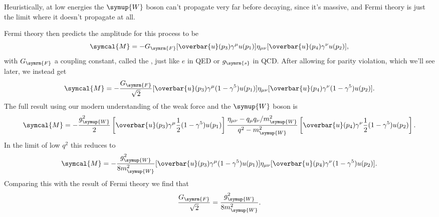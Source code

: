 \documentclass[fleqn]{NotesClass}
\newcommand{\Pparticle}[1]{\symup{#1}}
\newcommand{\PW}{\ensuremath{\Pparticle{W}}}
\newcommand{\strongCoupling}{g_{\symrm{s}}}
\newcommand{\amplitude}{\symcal{M}}
\newcommand{\diracadjoint}[1]{\overbar{#1}}
\newcommand{\minkowskiMetric}{\eta}
\newcommand{\fermiConstant}{G_{\symrm{F}}}
\begin{document}
    Heuristically, at low energies the \PW{} boson can't propagate very far before decaying, since it's massive, and Fermi theory is just the limit where it doesn't propagate at all.
    
    Fermi theory then predicts the amplitude for this process to be
    \begin{equation}
        \amplitude = -\fermiConstant[\overbar{u}(p_3) \gamma^\mu u(p_1)] \minkowskiMetric_{\mu\nu} [\overbar{u}(p_4) \gamma^\nu u(p_2)],
    \end{equation}
    with \(\fermiConstant\) a coupling constant, called the , just like \(e\) in QED or \(\strongCoupling\) in QCD.
    After allowing for parity violation, which we'll see later, we instead get
    \begin{equation}
        \amplitude = -\frac{\fermiConstant}{\sqrt{2}} [\diracadjoint{u}(p_3) \gamma^\mu (1 - \gamma^5) u(p_1)] \minkowskiMetric_{\mu\nu} [\diracadjoint{u}(p_4) \gamma^\nu (1 - \gamma^5) u(p_2)].
    \end{equation}
    The full result using our modern understanding of the weak force and the \PW{} boson is
    \begin{equation}
        \amplitude = -\frac{g_{\PW}^2}{2} \left[ \diracadjoint{u}(p_3) \gamma^\mu \frac{1}{2}(1 - \gamma^5)u(p_1) \right] \frac{\minkowskiMetric_{\mu\nu} - q_\mu q_\nu/m_{\PW}^2}{q^2 - m_{\PW}^2} \left[ \diracadjoint{u}(p_4) \gamma^\nu \frac{1}{2}(1 - \gamma^5) u(p_2) \right].
    \end{equation}
    In the limit of low \(q^2\) this reduces to
    \begin{equation}
        \amplitude = -\frac{g_{\PW}^2}{8m_{\PW}^2} [\diracadjoint{u}(p_3) \gamma^\mu (1 - \gamma^5) u(p_1)] \minkowskiMetric_{\mu\nu} [\diracadjoint{u}(p_4) \gamma^\nu(1 - \gamma^5) u(p_2)].
    \end{equation}
    Comparing this with the result of Fermi theory we find that
    \begin{equation}
        \frac{\fermiConstant}{\sqrt{2}} = \frac{g_{\PW}^2}{8m_{\PW}^2}.
    \end{equation}
    
\end{document}
